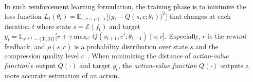 
In such reinforcement learning formulation, the training phase is to minimize the loss function $ L_t(\theta_t) = \mathbb{E}_{s, c \sim \rho (\cdot)}\Big[\big(y_t - Q(s, c; \theta_t)\big)^2 \Big] $ that changes at each iteration $ t $ where {\color{revise2} state $ s = \mathcal{E}(f_t) $} and target $ y_t = \mathbb{E}_{s^{t+1} \sim \{\mathcal{X}, M\}} \big[ r + \gamma \max_{c'} Q(s_{t+1}, c'; \theta_{t-1}) \mid s, c \big] $. Especially, $ r $ is the reward feedback, and $ \rho(s, c) $ is a probability distribution over {\color{revise2} state} $ s $ and the compression quality level $ c $~\cite{DQN}. When minimizing the distance of \emph{action-value function}'s output $ Q(\cdot) $ and target $ y_t $, the \emph{action-value function} $ Q(\cdot) $ outputs a more accurate estimation of an action. 

